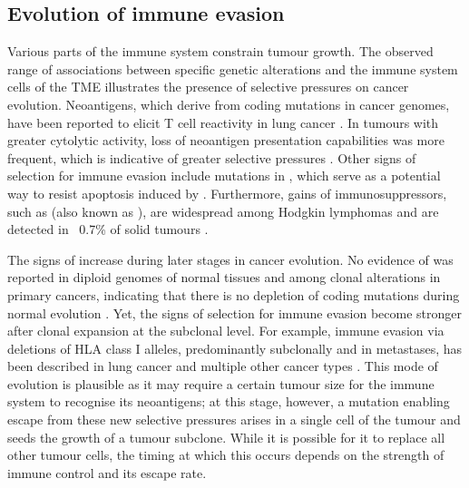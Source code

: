 \subsection*{Evolution of immune evasion}

Various parts of the immune system constrain tumour growth. The observed range of associations between specific genetic alterations and the immune system cells of the \ac{TME} \parencite{Rooney2015-yb,Thorsson2019-fk} illustrates the presence of selective pressures on cancer evolution. Neoantigens, which derive from coding mutations in cancer genomes, have been reported to elicit T cell reactivity in lung cancer \parencite{McGranahan2016-yd}. In tumours with greater cytolytic activity, loss of neoantigen presentation capabilities was more frequent, which is indicative of greater selective pressures \parencite{Rooney2015-yb,Shukla2015-kl}. Other signs of selection for immune evasion include mutations in , which serve as a potential way to resist apoptosis induced by  \parencite{Rooney2015-yb}. Furthermore, gains of immunosuppressors, such as  (also known as ), are widespread among Hodgkin lymphomas and are detected in ~0.7\% of solid tumours \parencite{Goodman2018-mn}.

The signs of  increase during later stages in cancer evolution. No evidence of  was reported in diploid genomes of normal tissues and among clonal alterations in primary cancers, indicating that there is no depletion of coding mutations during normal evolution \parencite{Martincorena2017-uw,Van_den_Eynden2019-aq}. Yet, the signs of selection for immune evasion become stronger after clonal expansion at the subclonal level. For example, immune evasion via deletions of \ac{HLA} class I alleles, predominantly subclonally and in metastases, has been described in lung cancer \parencite{McGranahan2017-ob} and multiple other cancer types \parencite{Watkins2020-gc} . This mode of evolution is plausible as it may require a certain tumour size for the immune system to recognise its neoantigens; at this stage, however, a mutation enabling escape from these new selective pressures arises in a single cell of the tumour and seeds the growth of a tumour subclone. While it is possible for it to replace all other tumour cells, the timing at which this occurs depends on the strength of immune control and its escape rate.

